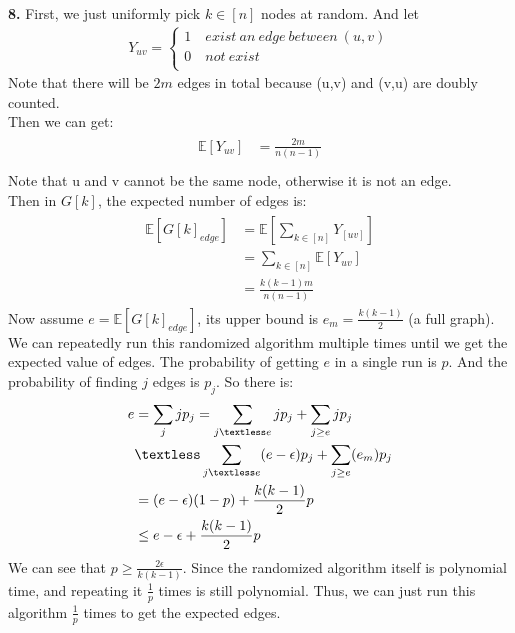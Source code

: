 \documentclass[titlepage, paper=a4, fontsize=11pt]{scrartcl} %
\numberwithin{equation}{section} %
\numberwithin{figure}{section} %
\numberwithin{table}{section} %
\begin{document}
\textbf{8.}
First, we just uniformly pick $k \in [n]$ nodes at random. And let
\begin{gather*}
Y_{uv} =
\begin{cases}
1 \quad exist\ an\ edge\ between\ (u,v) \\
0 \quad not\ exist \\
\end{cases}
\end{gather*}
Note that there will be $2m$ edges in total because (u,v) and (v,u) are doubly counted. \\
Then we can get:
\begin{align*} 
\begin{split}
\mathbb{E}[Y_{uv}] &= \frac{2m}{n(n-1)} \\
\end{split}					
\end{align*}
Note that u and v cannot be the same node, otherwise it is not an edge. \\
Then in $G[k]$, the expected number of edges is:
\begin{align*} 
\begin{split}
\mathbb{E}[G[k]_{edge}] &= \mathbb{E}[\sum_{k \in [n]} Y_[uv]] \\
&= \sum_{k \in [n]} \mathbb{E}[Y_{uv}] \\
&= \frac{k(k-1)m}{n(n-1)}
\end{split}					
\end{align*}
Now assume $e=\mathbb{E}[G[k]_{edge}]$, its upper bound is $e_m = \frac{k(k-1)}{2}$ (a full graph).
We can repeatedly run this randomized algorithm multiple times until we get the expected value of edges. The probability of getting $e$ in a single run is $p$. And the probability of finding $j$ edges is $p_j$.
So there is:
\begin{align*} 
\begin{split}
e &= \sum_{j}jp_j = \sum_{j \textless e}jp_j + \sum_{j \geq e}jp_j \\
&\textless \sum_{j \textless e}(e - \epsilon)p_j + \sum_{j \geq e}(e_m)p_j \\
&= (e-\epsilon)(1-p) + \frac{k(k-1)}{2}p \\
&\leq e - \epsilon + \frac{k(k-1)}{2}p
\end{split}					
\end{align*}
We can see that $p \geq \frac{2\epsilon}{k(k-1)}$. Since the randomized algorithm itself is polynomial time, and repeating it $\frac{1}{p}$ times is still polynomial. Thus, we can just run this algorithm $\frac{1}{p}$ times to get the expected edges.
\end{document}
